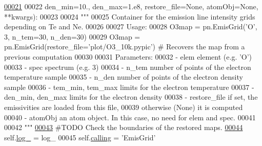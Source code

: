 \begin{DoxyCode}
\hypertarget{classpyneb_1_1core_1_1emis_grid_1_1_emis_grid_l00021}{}\hyperlink{classpyneb_1_1core_1_1emis_grid_1_1_emis_grid_a0d2694aa16812dc5b3dba4fb8da02f57}{00021} 
00022                  den\_min=10., den\_max=1.e8, restore\_file=\textcolor{keywordtype}{None}, atomObj=\textcolor{keywordtype}{None}, **kwargs):
00023 
00024         \textcolor{stringliteral}{"""}
00025 \textcolor{stringliteral}{        Container for the emission line intensity grids depending on Te and Ne.}
00026 \textcolor{stringliteral}{}
00027 \textcolor{stringliteral}{        Usage:}
00028 \textcolor{stringliteral}{            O3map = pn.EmisGrid('O', 3, n\_tem=30, n\_den=30)}
00029 \textcolor{stringliteral}{            O3map = pn.EmisGrid(restore\_file='plot/O3\_10k.pypic') # Recovers the map from a previous
       computation}
00030 \textcolor{stringliteral}{}
00031 \textcolor{stringliteral}{        Parameters:}
00032 \textcolor{stringliteral}{            - elem               element (e.g. 'O')}
00033 \textcolor{stringliteral}{            - spec               spectrum (e.g. 3)}
00034 \textcolor{stringliteral}{            - n\_tem              number of points of the electron temperature sample}
00035 \textcolor{stringliteral}{            - n\_den              number of points of the electron density sample}
00036 \textcolor{stringliteral}{            - tem\_min, tem\_max   limits for the electron temperature}
00037 \textcolor{stringliteral}{            - den\_min, den\_max   limits for the electron density}
00038 \textcolor{stringliteral}{            - restore\_file       if set, the emissivities are loaded from this file, }
00039 \textcolor{stringliteral}{                                 otherwise (None) it is computed}
00040 \textcolor{stringliteral}{            - atomObj            an atom object. In this case, no need for elem and spec.}
00041 \textcolor{stringliteral}{}
00042 \textcolor{stringliteral}{        """}
\hypertarget{classpyneb_1_1core_1_1emis_grid_1_1_emis_grid_l00043}{}\hyperlink{classpyneb_1_1core_1_1emis_grid_1_1_emis_grid_a1a53003d1e4a12bbc4ff9233a3fcd54a}{00043}         \textcolor{comment}{#TODO Check the boundaries of the restored maps.}
\hypertarget{classpyneb_1_1core_1_1emis_grid_1_1_emis_grid_l00044}{}\hyperlink{classpyneb_1_1core_1_1emis_grid_1_1_emis_grid_a19820878261ee98513e0b755e688453f}{00044}         self.\hyperlink{classpyneb_1_1core_1_1emis_grid_1_1_emis_grid_a1a53003d1e4a12bbc4ff9233a3fcd54a}{log\_} = log\_
00045         self.\hyperlink{classpyneb_1_1core_1_1emis_grid_1_1_emis_grid_a19820878261ee98513e0b755e688453f}{calling} = \textcolor{stringliteral}{'EmisGrid'}

\end{DoxyCode}
